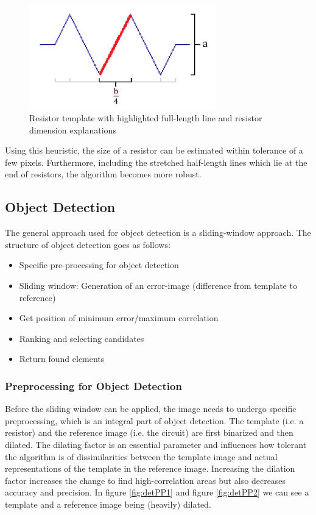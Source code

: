 \documentclass[10pt,twocolumn,letterpaper]{article}
\begin{document}
\begin{figure}[!ht]
\includegraphics[width = 3.2in]{img/resdim.png}
\caption{Resistor template with highlighted full-length line and resistor dimension explanations}
\label{fig:c9}
\end{figure}

\par
Using this heuristic, the size of a resistor can be estimated within tolerance of a few pixels. Furthermore, including the stretched half-length lines which lie at the end of resistors, the algorithm becomes more robust.

\subsection{Object Detection}
\label{subsec:obj}

The general approach used for object detection is a sliding-window approach. The structure of object detection goes as follows: 
\begin{itemize}
	\item Specific pre-processing for object detection
	\item Sliding window: Generation of an error-image (difference from template to reference)
	\item Get position of minimum error/maximum correlation
	\item Ranking and selecting candidates
	\item Return found elements
\end{itemize}

\subsubsection*{Preprocessing for Object Detection}

Before the sliding window can be applied, the image needs to undergo specific preprocessing, which is an integral part of object detection. The template (i.e. a resistor) and the reference image (i.e. the circuit) are first binarized and then dilated. The dilating factor is an essential parameter and influences how tolerant the algorithm is of dissimilarities between the template image and actual representations of the template in the reference image. Increasing the dilation factor increases the change to find high-correlation areas but also decreases accuracy and precision. In figure \ref{fig:detPP1} and figure \ref{fig:detPP2} we can see a template and a reference image being (heavily) dilated.
\par
\end{document}
